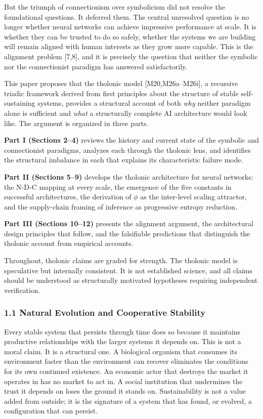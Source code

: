 \documentclass[
  11pt,
  letterpaper,
]{article}
\begin{document}
But the triumph of connectionism over symbolicism did not resolve the
foundational questions. It deferred them. The central unresolved
question is no longer whether neural networks can achieve impressive
performance at scale. It is whether they can be trusted to do so safely,
whether the systems we are building will remain aligned with human
interests as they grow more capable. This is the alignment problem
{[}7,8{]}, and it is precisely the question that neither the symbolic
nor the connectionist paradigm has answered satisfactorily.

This paper proposes that the tholonic model {[}M20,M26a--M26i{]}, a
recursive triadic framework derived from first principles about the
structure of stable self-sustaining systems, provides a structural
account of both \emph{why} neither paradigm alone is sufficient and
\emph{what} a structurally complete AI architecture would look like. The
argument is organized in three parts.

\textbf{Part I (Sections 2--4)} reviews the history and current state of
the symbolic and connectionist paradigms, analyzes each through the
tholonic lens, and identifies the structural imbalance in each that
explains its characteristic failure mode.

\textbf{Part II (Sections 5--9)} develops the tholonic architecture for
neural networks: the N-D-C mapping at every scale, the emergence of the
five constants in successful architectures, the derivation of \(\phi\)
as the inter-level scaling attractor, and the supply-chain framing of
inference as progressive entropy reduction.

\textbf{Part III (Sections 10--12)} presents the alignment argument, the
architectural design principles that follow, and the falsifiable
predictions that distinguish the tholonic account from empirical
accounts.

Throughout, tholonic claims are graded for strength. The tholonic model
is speculative but internally consistent. It is not established science,
and all claims should be understood as structurally motivated hypotheses
requiring independent verification.

\subsubsection{1.1 Natural Evolution and Cooperative
Stability}\label{natural-evolution-and-cooperative-stability}

Every stable system that persists through time does so because it
maintains productive relationships with the larger systems it depends
on. This is not a moral claim. It is a structural one. A biological
organism that consumes its environment faster than the environment can
recover eliminates the conditions for its own continued existence. An
economic actor that destroys the market it operates in has no market to
act in. A social institution that undermines the trust it depends on
loses the ground it stands on. Sustainability is not a value added from
outside; it is the signature of a system that has found, or evolved, a
configuration that can persist.
\end{document}
